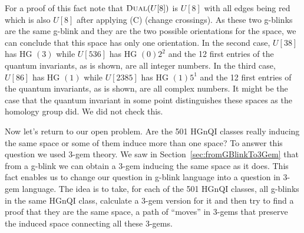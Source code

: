 For a proof of this fact note that
$\textsc{Dual}(U[8])$ is $U[8]$ with
all edges being red which is also $U[8]$ after applying (C)
(change crossings). As these two g-blinks are the same
g-blink and they are the two possible orientations
for the space, we can conclude that this space has only
one orientation. In the second case, $U[38]$ has HG $(3)$
while $U[536]$ has HG $(0) 2^2$ and the 12 first
entries of the quantum invariants, as is shown,
are all integer numbers. In the third case, $U[86]$ has HG $(1)$
while $U[2385]$ has HG $(1) 5^1$ and the 12 first
entries of the quantum invariants, as is shown,
are all complex numbers. It might be the case that
the quantum invariant in some point distinguishes these
spaces as the homology group did. We did not check this.

Now let's return to our open problem. Are the 501 HGnQI
classes really inducing the same space or some of them
induce more than one space? To answer this question we
used 3-gem theory. We saw in Section~\ref{sec:fromGBlinkTo3Gem}
that from a g-blink we can obtain a 3-gem inducing the
same space as it does. This fact enables us to change
our question in g-blink language into a question in 3-gem language. The
idea is to take, for each of the 501 HGnQI classes, all g-blinks
in the same HGnQI class, calculate a 3-gem version for it
and then try to find a proof that they are the same space, \ie
a path of ``moves'' in 3-gems that preserve the induced space
connecting all these 3-gems.

\newcommand{\GemOfGBlink}{
\parbox{7.5cm}{
\begin{footnotesize}
\setstretch{1.25}
\begin{algorithmic}[1]
   \Function{GemOfGBlink}{$G$}
   \State $J \leftarrow \textsc{GBlink2Gem}(G)$
   \While{true}
      \State $\textsc{SimplifyGem}(J)$
      \State $\textsc{SearchInTSClass}(J,12\, {\rm seconds})$
      \If{$J$ has no dipole, no $\rho_2$-pair and no $\rho_3$-pair}
         \State break
      \EndIf
   \EndWhile
   \State {\bf return} \,\, $J$
   \EndFunction
\end{algorithmic}
\end{footnotesize}
}}

